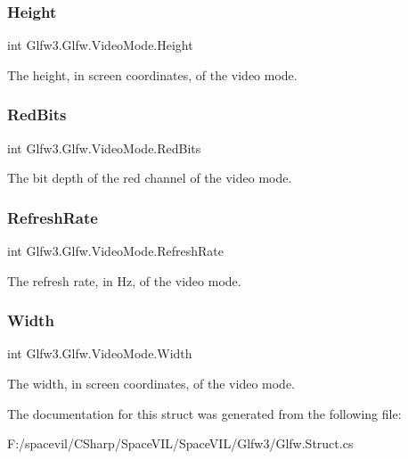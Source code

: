 \subsubsection{\texorpdfstring{Height}{Height}}
{\footnotesize\ttfamily int Glfw3.\+Glfw.\+Video\+Mode.\+Height}



The height, in screen coordinates, of the video mode. 

\mbox{\label{struct_glfw3_1_1_glfw_1_1_video_mode_a771615384f780b5d3ceb33dec6f139be}} 
\subsubsection{\texorpdfstring{Red\+Bits}{RedBits}}
{\footnotesize\ttfamily int Glfw3.\+Glfw.\+Video\+Mode.\+Red\+Bits}



The bit depth of the red channel of the video mode. 

\mbox{\label{struct_glfw3_1_1_glfw_1_1_video_mode_ab86d4f450f14b35aa0a9bb79b11b2480}} 
\subsubsection{\texorpdfstring{Refresh\+Rate}{RefreshRate}}
{\footnotesize\ttfamily int Glfw3.\+Glfw.\+Video\+Mode.\+Refresh\+Rate}



The refresh rate, in Hz, of the video mode. 

\mbox{\label{struct_glfw3_1_1_glfw_1_1_video_mode_a1f3cba74260bd3f171d70255f98a1e9b}} 
\subsubsection{\texorpdfstring{Width}{Width}}
{\footnotesize\ttfamily int Glfw3.\+Glfw.\+Video\+Mode.\+Width}



The width, in screen coordinates, of the video mode. 



The documentation for this struct was generated from the following file\+:\begin{DoxyCompactItemize}
\item 
F\+:/spacevil/\+C\+Sharp/\+Space\+V\+I\+L/\+Space\+V\+I\+L/\+Glfw3/Glfw.\+Struct.\+cs\end{DoxyCompactItemize}
